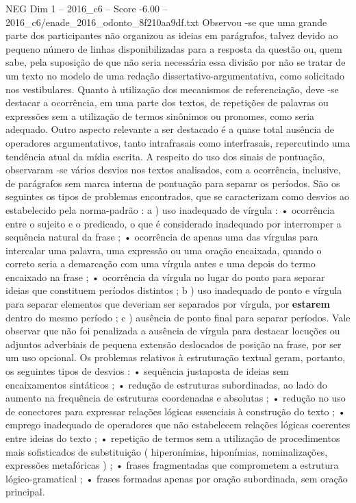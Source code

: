 \begin{textsample}{NEG Dim 1 – 2016\_c6 – Score -6.00 – 2016\_c6/enade\_2016\_odonto\_8f210aa9df.txt}
Observou -se que uma grande parte dos participantes não organizou as ideias em parágrafos, talvez devido ao pequeno número de linhas disponibilizadas para a resposta da questão ou, quem sabe, pela suposição de que não seria necessária essa divisão por não se tratar de um texto no modelo de uma redação dissertativo-argumentativa, como solicitado nos vestibulares.
Quanto à utilização dos mecanismos de referenciação, deve -se destacar a ocorrência, em uma parte dos textos, de repetições de palavras ou expressões sem a utilização de termos sinônimos ou pronomes, como seria adequado.
Outro aspecto relevante a ser destacado é a quase total ausência de operadores argumentativos, tanto intrafrasais como interfrasais, repercutindo uma tendência atual da mídia escrita.
A respeito do uso dos sinais de pontuação, observaram -se vários desvios nos textos analisados, com a ocorrência, inclusive, de parágrafos sem marca interna de pontuação para separar os períodos.
São os seguintes os tipos de problemas encontrados, que se caracterizam como desvios ao estabelecido pela norma-padrão : a ) uso inadequado de vírgula : • ocorrência entre o sujeito e o predicado, o que é considerado inadequado por interromper a sequência natural da frase ; • ocorrência de apenas uma das vírgulas para intercalar uma palavra, uma expressão ou uma oração encaixada, quando o correto seria a demarcação com uma vírgula antes e uma depois do termo encaixado na frase ; • ocorrência da vírgula no lugar do ponto para separar ideias que constituem períodos distintos ; b ) uso inadequado de ponto e vírgula para separar elementos que deveriam ser separados por vírgula, por \textbf{estarem} dentro do mesmo período ; c ) ausência de ponto final para separar períodos.
Vale observar que não foi penalizada a ausência de vírgula para destacar locuções ou adjuntos adverbiais de pequena extensão deslocados de posição na frase, por ser um uso opcional.
Os problemas relativos à estruturação textual geram, portanto, os seguintes tipos de desvios : • sequência justaposta de ideias sem encaixamentos sintáticos ; • redução de estruturas subordinadas, ao lado do aumento na frequência de estruturas coordenadas e absolutas ; • redução no uso de conectores para expressar relações lógicas essenciais à construção do texto ; • emprego inadequado de operadores que não estabelecem relações lógicas coerentes entre ideias do texto ; • repetição de termos sem a utilização de procedimentos mais sofisticados de substituição ( hiperonímias, hiponímias, nominalizações, expressões metafóricas ) ; • frases fragmentadas que comprometem a estrutura lógico-gramatical ; • frases formadas apenas por oração subordinada, sem oração principal.

\end{textsample}
